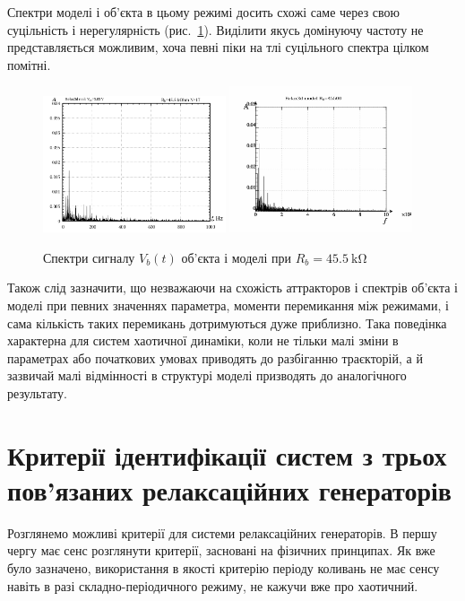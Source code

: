 Спектри моделі і об'єкта в цьому режимі досить схожі саме через
свою суцільність і нерегулярність (рис.~\ref{atu:f:relax3d_mo_f_17}). Виділити
якусь домінуючу частоту не представляється можливим, хоча
певні піки на тлі суцільного спектра цілком помітні.

\begin{figure}[htb!]
  \centerline{
    \hfill
    \includegraphics[width=0.48\textwidth]{p/relax3_f_17.png}
    \hfill
    \includegraphics[width=0.48\textwidth]{p/relax3d_read_q-p_fm_17a.png}
    \hfill
  }
\caption{Спектри сигналу $ V_b (t) $ об'єкта і моделі при $ R_b = \SI{45.5}{\kilo \ohm} $}
\label{atu:f:relax3d_mo_f_17}
\end{figure}

Також слід зазначити, що незважаючи на схожість аттракторов
і спектрів об'єкта і моделі при певних значеннях параметра,
моменти перемикання між режимами, і сама кількість таких
перемикань дотримуються дуже приблизно. Така поведінка
характерна для систем хаотичної динаміки, коли не тільки
малі зміни в параметрах або початкових умовах приводять до
разбіганню траєкторій, а й зазвичай малі відмінності в
структурі моделі призводять до аналогічного результату.



\section{Критерії ідентифікації систем з трьох пов'язаних релаксаційних генераторів}

Розглянемо можливі критерії для системи релаксаційних
генераторів. В першу чергу має сенс розглянути критерії,
засновані на фізичних принципах. Як вже було зазначено,
використання в якості критерію періоду коливань не
має сенсу навіть в разі складно-періодичного режиму, не
кажучи вже про хаотичний.

